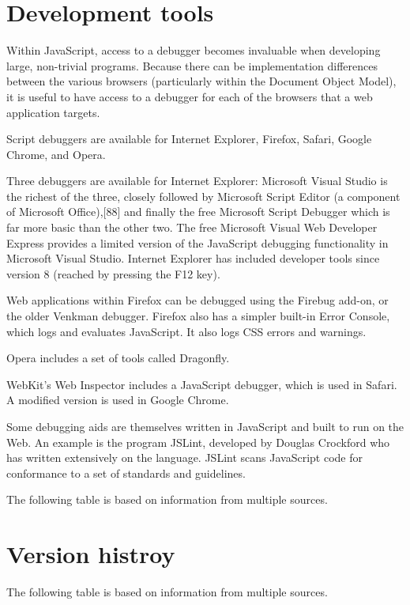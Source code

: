 \chapter{Development tools}


Within JavaScript, access to a debugger becomes invaluable when developing large, non-trivial programs. Because there can be implementation differences between the various browsers (particularly within the Document Object Model), it is useful to have access to a debugger for each of the browsers that a web application targets.


Script debuggers are available for Internet Explorer, Firefox, Safari, Google Chrome, and Opera.

Three debuggers are available for Internet Explorer: Microsoft Visual Studio is the richest of the three, closely followed by Microsoft Script Editor (a component of Microsoft Office),[88] and finally the free Microsoft Script Debugger which is far more basic than the other two. The free Microsoft Visual Web Developer Express provides a limited version of the JavaScript debugging functionality in Microsoft Visual Studio. Internet Explorer has included developer tools since version 8 (reached by pressing the F12 key).


Web applications within Firefox can be debugged using the Firebug add-on, or the older Venkman debugger. Firefox also has a simpler built-in Error Console, which logs and evaluates JavaScript. It also logs CSS errors and warnings.


Opera includes a set of tools called Dragonfly.

WebKit's Web Inspector includes a JavaScript debugger, which is used in Safari. A modified version is used in Google Chrome.

Some debugging aids are themselves written in JavaScript and built to run on the Web. An example is the program JSLint, developed by Douglas Crockford who has written extensively on the language. JSLint scans JavaScript code for conformance to a set of standards and guidelines.

The following table is based on information from multiple sources.


\chapter{Version histroy}

\vspace{-20pt}

The following table is based on information from multiple sources.


